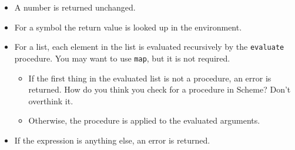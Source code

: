 \documentclass[letterpaper,12pt]{article}
\begin{document}
\begin{multicols}{2}
\begin{itemize}
\item A number is returned unchanged.

\item For a symbol the return value is looked up in the environment.

\item For a list, each element in the list is evaluated recursively by
  the {\tt evaluate} procedure.  You may
  want to use {\tt map}, but it is not required.
  \begin{itemize}\setlength{\itemsep}{0pt}

  \item If the first thing in the evaluated list is not a procedure, an error is
    returned.  How do you think you check for a procedure in Scheme?  Don't
    overthink it.

  \item Otherwise, the procedure is applied to the evaluated arguments.

  \end{itemize}

\item If the expression is anything else, an error is returned.
\end{itemize}
\end{multicols}
\end{document}
